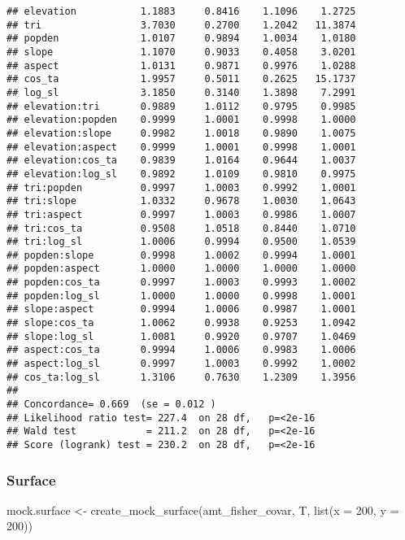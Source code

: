 \documentclass[
]{article}
\newenvironment{Shaded}{\begin{snugshade}}{\end{snugshade}}
\newcommand{\AttributeTok}[1]{\textcolor[rgb]{0.77,0.63,0.00}{#1}}
\newcommand{\DecValTok}[1]{\textcolor[rgb]{0.00,0.00,0.81}{#1}}
\newcommand{\FunctionTok}[1]{\textcolor[rgb]{0.00,0.00,0.00}{#1}}
\newcommand{\NormalTok}[1]{#1}
\newcommand{\OtherTok}[1]{\textcolor[rgb]{0.56,0.35,0.01}{#1}}
\begin{document}
\begin{verbatim}
## elevation           1.1883     0.8416    1.1096    1.2725
## tri                 3.7030     0.2700    1.2042   11.3874
## popden              1.0107     0.9894    1.0034    1.0180
## slope               1.1070     0.9033    0.4058    3.0201
## aspect              1.0131     0.9871    0.9976    1.0288
## cos_ta              1.9957     0.5011    0.2625   15.1737
## log_sl              3.1850     0.3140    1.3898    7.2991
## elevation:tri       0.9889     1.0112    0.9795    0.9985
## elevation:popden    0.9999     1.0001    0.9998    1.0000
## elevation:slope     0.9982     1.0018    0.9890    1.0075
## elevation:aspect    0.9999     1.0001    0.9998    1.0001
## elevation:cos_ta    0.9839     1.0164    0.9644    1.0037
## elevation:log_sl    0.9892     1.0109    0.9810    0.9975
## tri:popden          0.9997     1.0003    0.9992    1.0001
## tri:slope           1.0332     0.9678    1.0030    1.0643
## tri:aspect          0.9997     1.0003    0.9986    1.0007
## tri:cos_ta          0.9508     1.0518    0.8440    1.0710
## tri:log_sl          1.0006     0.9994    0.9500    1.0539
## popden:slope        0.9998     1.0002    0.9994    1.0001
## popden:aspect       1.0000     1.0000    1.0000    1.0000
## popden:cos_ta       0.9997     1.0003    0.9993    1.0002
## popden:log_sl       1.0000     1.0000    0.9998    1.0001
## slope:aspect        0.9994     1.0006    0.9987    1.0001
## slope:cos_ta        1.0062     0.9938    0.9253    1.0942
## slope:log_sl        1.0081     0.9920    0.9707    1.0469
## aspect:cos_ta       0.9994     1.0006    0.9983    1.0006
## aspect:log_sl       0.9997     1.0003    0.9992    1.0002
## cos_ta:log_sl       1.3106     0.7630    1.2309    1.3956
## 
## Concordance= 0.669  (se = 0.012 )
## Likelihood ratio test= 227.4  on 28 df,   p=<2e-16
## Wald test            = 211.2  on 28 df,   p=<2e-16
## Score (logrank) test = 230.2  on 28 df,   p=<2e-16
\end{verbatim}

\hypertarget{surface-1}{%
\subsubsection{Surface}\label{surface-1}}

\begin{Shaded}
\begin{Highlighting}[]
\NormalTok{mock.surface }\OtherTok{\textless{}{-}} \FunctionTok{create\_mock\_surface}\NormalTok{(amt\_fisher\_covar, T, }\FunctionTok{list}\NormalTok{(}\AttributeTok{x =} \DecValTok{200}\NormalTok{, }\AttributeTok{y =} \DecValTok{200}\NormalTok{))}
\end{Highlighting}
\end{Shaded}
\end{document}
